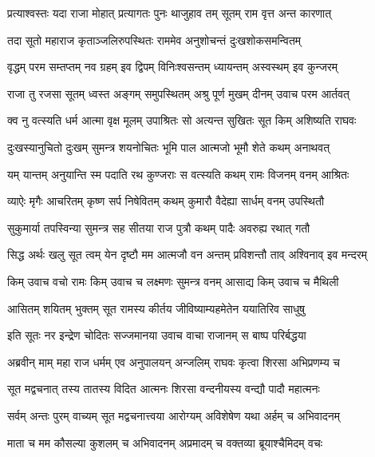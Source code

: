 
\twolineshloka
{प्रत्याश्वस्तः यदा राजा मोहात् प्रत्यागतः पुनः}
{थाजुहाव तम् सूतम् राम वृत्त अन्त कारणात्} %

\twolineshloka
{तदा सूतो महाराज कृताञ्जलिरुपस्थितः}
{राममेव अनुशोचन्तं दुःखशोकसमन्वितम्} %

\twolineshloka
{वृद्धम् परम सम्तप्तम् नव ग्रहम् इव द्विपम्}
{विनिःश्वसन्तम् ध्यायन्तम् अस्वस्थम् इव कुन्जरम्} %

\twolineshloka
{राजा तु रजसा सूतम् ध्वस्त अङ्गम् समुपस्थितम्}
{अश्रु पूर्ण मुखम् दीनम् उवाच परम आर्तवत्} %

\twolineshloka
{क्व नु वत्स्यति धर्म आत्मा वृक्ष मूलम् उपाश्रितः}
{सो अत्यन्त सुखितः सूत किम् अशिष्यति राघवः} %

\twolineshloka
{दुःखस्यानुचितो दुःखम् सुमन्त्र शयनोचितः}
{भूमि पाल आत्मजो भूमौ शेते कथम् अनाथवत्} %

\twolineshloka
{यम् यान्तम् अनुयान्ति स्म पदाति रथ कुण्जराः}
{स वत्स्यति कथम् रामः विजनम् वनम् आश्रितः} %

\twolineshloka
{व्याऐः मृगैः आचरितम् कृष्ण सर्प निषेवितम्}
{कथम् कुमारौ वैदेह्या सार्धम् वनम् उपस्थितौ} %

\twolineshloka
{सुकुमार्या तपस्विन्या सुमन्त्र सह सीतया}
{राज पुत्रौ कथम् पादैः अवरुह्य रथात् गतौ} %

\twolineshloka
{सिद्ध अर्थः खलु सूत त्वम् येन दृष्टौ मम आत्मजौ}
{वन अन्तम् प्रविशन्तौ ताव् अश्विनाव् इव मन्दरम्} %

\twolineshloka
{किम् उवाच वचो रामः किम् उवाच च लक्ष्मणः}
{सुमन्त्र वनम् आसाद्य किम् उवाच च मैथिली} %

\twolineshloka
{आसितम् शयितम् भुक्तम् सूत रामस्य कीर्तय}
{जीविष्याम्यहमेतेन ययातिरिव साधुषु} %

\twolineshloka
{इति सूतः नर इन्द्रेण चोदितः सज्जमानया}
{उवाच वाचा राजानम् स बाष्प परिर्बद्धया} %

\twolineshloka
{अब्रवीन् माम् महा राज धर्मम् एव अनुपालयन्}
{अन्जलिम् राघवः कृत्वा शिरसा अभिप्रणम्य च} %

\twolineshloka
{सूत मद्वचनात् तस्य तातस्य विदित आत्मनः}
{शिरसा वन्दनीयस्य वन्द्यौ पादौ महात्मनः} %

\twolineshloka
{सर्वम् अन्तः पुरम् वाच्यम् सूत मद्वचनात्त्वया}
{आरोग्यम् अविशेषेण यथा अर्हम् च अभिवादनम्} %

\twolineshloka
{माता च मम कौसल्या कुशलम् च अभिवादनम्}
{अप्रमादम् च वक्तव्या ब्रूयाश्चैमिदम् वचः} %

